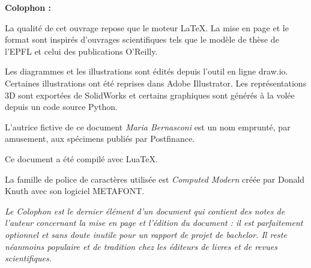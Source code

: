 \clearpage
\Large\textbf{Colophon :}\par\normalsize
\thispagestyle{empty}
La qualité de cet ouvrage repose que le moteur \LaTeX. La mise en page et le format sont inspirés d'ouvrages scientifiques tels que le modèle de thèse de l'EPFL et celui des publications O'Reilly.

Les diagrammes et les illustrations sont édités depuis l'outil en ligne draw.io. Certaines illustrations ont été reprises dans Adobe Illustrator. Les représentations 3D sont exportées de SolidWorks et certains graphiques sont générés à la volée depuis un code source Python.

L'autrice fictive de ce document \emph{Maria Bernasconi} est un nom emprunté, par amusement, aux spécimens publiés par Postfinance.

Ce document a été compilé avec \mbox{Lua\TeX}.

La famille de police de caractères utilisée est \emph{Computed Modern} créée par Donald Knuth avec son logiciel METAFONT.

\vfil

\emph{Le Colophon est le dernier élément d'un document qui contient des notes de l'auteur concernant la mise en page et l'édition du document : il est parfaitement optionnel et sans doute inutile pour un rapport de projet de bachelor. Il reste néanmoins populaire et de tradition chez les éditeurs de livres et de revues scientifiques.}
